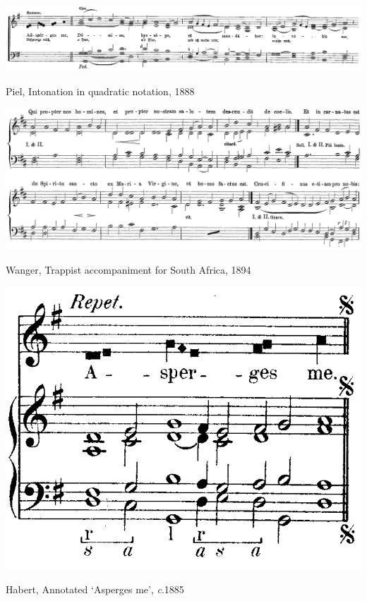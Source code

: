 \vspace*{\fill}

\begin{landscape}

  \vspace*{\fill}

  \begin{example}
    \centering
    \includegraphics[width=\linewidth]{c/3/ex/piel_mohrordinarium_2.png}
    \caption{Piel, Intonation in quadratic notation, 1888}
    \label{mus:piel_mohrordinarium_2}
  \end{example}

  \vspace*{\fill}

\end{landscape}

\begin{landscape}

  \vspace*{\fill}

  \begin{example}
    \centering
    \includegraphics[width=.7\linewidth]{c/1/ex/willibald_20.jpeg}
    \caption{Wanger, Trappist accompaniment for South Africa, 1894}
    \label{mus:willibald_20}
  \end{example}

  \vspace*{\fill}

\end{landscape}

\vspace*{\fill}

\begin{example}
  \centering
  \includegraphics[width=.5\linewidth]{c/3/ex/habert.png}
  \caption{Habert, Annotated `Asperges me', \emph{c}.1885}
  \label{mus:habert}
\end{example}

